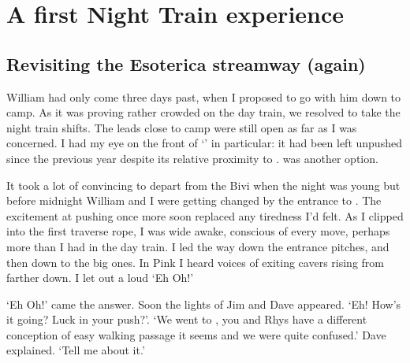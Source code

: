 \section{A first Night Train experience}

\subsection{Revisiting the Esoterica streamway (again)}
William had only come three days past, when I proposed to go with him down to camp. As it was proving rather crowded on the day train, we resolved to take the night train shifts. The leads close to camp were still open as far as I was concerned. I had my eye on the front of `' in particular: it had been left unpushed since the previous year despite its relative proximity to .  was another option.

It took a lot of convincing to depart from the Bivi when the night was young but before midnight William and I were getting changed by the entrance to . The excitement at pushing once more soon replaced any tiredness I'd felt. As I clipped into the first traverse rope, I was wide awake, conscious of every move, perhaps more than I had in the day train. I led the way down the entrance pitches, and then down to the big ones. In Pink I heard voices of exiting cavers rising from farther down. I let out a loud `Eh Oh!'

 `Eh Oh!' came the answer. Soon the lights of Jim and Dave appeared. `Eh! How's it going? Luck in your push?'.
`We went to , you and Rhys have a different conception of easy walking passage it seems and we were quite confused.' Dave explained.
`Tell me about it.'

